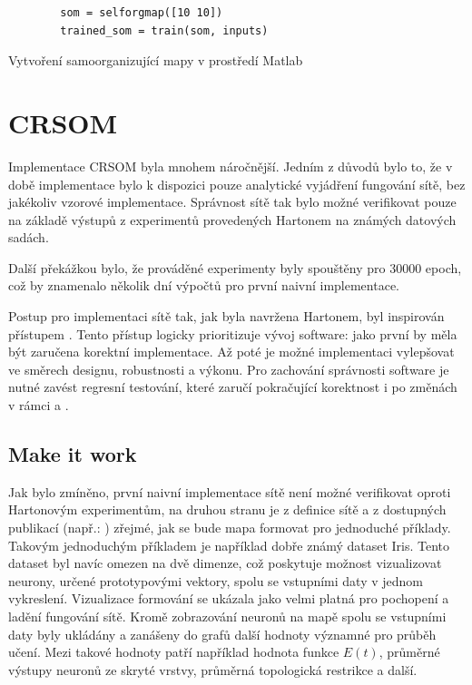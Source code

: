 \documentclass[thesis=M,czech]{FITthesis}[2012/06/26]
\begin{document}
\begin{listing}
    \begin{verbatim}
        som = selforgmap([10 10])
        trained_som = train(som, inputs)
    \end{verbatim} 
    \caption{Vytvoření samoorganizující mapy v prostředí Matlab} 
    \label{somcode}
\end{listing}

\section{CRSOM}\label{sec:crsom_impl}


Implementace CRSOM byla mnohem náročnější. Jedním z důvodů bylo to, že v době implementace bylo k dispozici pouze analytické vyjádření fungování sítě, bez jakékoliv vzorové implementace.
Správnost sítě tak bylo možné verifikovat pouze na základě výstupů z experimentů provedených Hartonem na známých datových sadách\cite{hartono14}.

Další překážkou bylo, že prováděné experimenty byly spouštěny pro $30 000$ epoch, což by znamenalo několik dní výpočtů pro první naivní implementace.
	
Postup pro implementaci sítě tak, jak byla navržena Hartonem, byl inspirován přístupem \textit{}\cite{makeit}. 
Tento přístup logicky prioritizuje vývoj software: jako první by měla být zaručena korektní implementace. Až poté je možné implementaci vylepšovat ve směrech designu, robustnosti a výkonu. Pro zachování správnosti software je nutné zavést regresní testování, které zaručí pokračující korektnost i po změnách v rámci  a .

\subsection{Make it work}
 Jak bylo zmíněno, první naivní implementace sítě není možné verifikovat oproti Hartonovým experimentům, na druhou stranu je z definice sítě a z dostupných publikací (např.: \cite{hartono14}) zřejmé, jak se bude mapa formovat pro jednoduché příklady. Takovým jednoduchým příkladem je například dobře známý dataset Iris. Tento dataset byl navíc omezen na dvě dimenze, což poskytuje možnost vizualizovat neurony, určené prototypovými vektory, spolu se vstupními daty v jednom vykreslení. Vizualizace formování se ukázala jako velmi platná pro pochopení a ladění fungování sítě. Kromě zobrazování neuronů na mapě spolu se vstupními daty byly ukládány a zanášeny do grafů další hodnoty významné pro průběh učení. Mezi takové hodnoty patří například hodnota funkce $E(t)$, průměrné výstupy neuronů ze skryté vrstvy, průměrná topologická restrikce a další.
 
\end{document}
